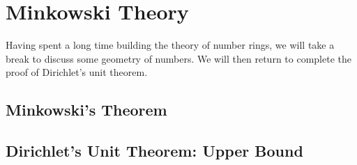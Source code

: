 \documentclass[../notes.tex]{subfiles}
\begin{document}
\section{Minkowski Theory}

Having spent a long time building the theory of number rings, we will take a break to discuss some geometry of numbers. We will then return to complete the proof of Dirichlet's unit theorem.

\subsection{Minkowski's Theorem}

\subsection{Dirichlet's Unit Theorem: Upper Bound}
\end{document}
